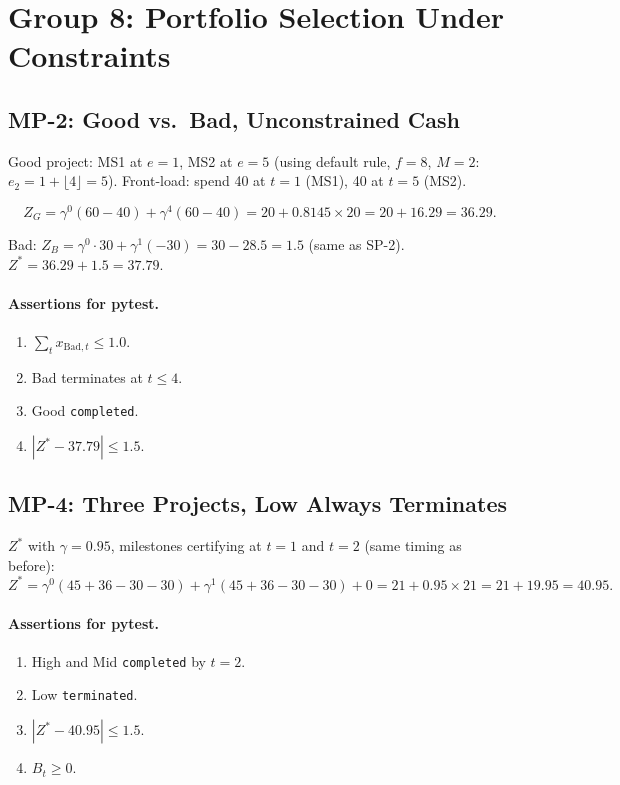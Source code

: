 \documentclass[11pt, a4paper]{article}
\begin{document}
\section{Group 8: Portfolio Selection Under Constraints}

\subsection{MP-2: Good vs.\ Bad, Unconstrained Cash}

Good project: MS1 at $e=1$, MS2 at $e=5$ (using default rule,
$f=8$, $M=2$: $e_2=1+\lfloor4\rfloor=5$).
Front-load: spend 40 at $t=1$ (MS1), 40 at $t=5$ (MS2).

\[
  Z_G = \gamma^0(60-40)+\gamma^4(60-40)
      = 20+0.8145\times20 = 20+16.29 = \mathbf{36.29}.
\]

Bad: $Z_B=\gamma^0\cdot30+\gamma^1(-30)=30-28.5=1.5$ (same as SP-2).
$Z^*=36.29+1.5=\mathbf{37.79}$.

\paragraph{Assertions for pytest.}
\begin{enumerate}[label=A\arabic*.]
  \item $\sum_t x_{\mathrm{Bad},t}\leq1.0$.
  \item Bad terminates at $t\leq4$.
  \item Good \texttt{completed}.
  \item $|Z^*-37.79|\leq1.5$.
\end{enumerate}

\subsection{MP-4: Three Projects, Low Always Terminates}

$Z^*$ with $\gamma=0.95$, milestones certifying at $t=1$ and $t=2$
(same timing as before):
\[
  Z^* = \gamma^0(45+36-30-30)+\gamma^1(45+36-30-30)+0
      = 21+0.95\times21 = 21+19.95 = \mathbf{40.95}.
\]

\paragraph{Assertions for pytest.}
\begin{enumerate}[label=A\arabic*.]
  \item High and Mid \texttt{completed} by $t=2$.
  \item Low \texttt{terminated}.
  \item $|Z^*-40.95|\leq1.5$.
  \item $B_t\geq0$.
\end{enumerate}
\end{document}

